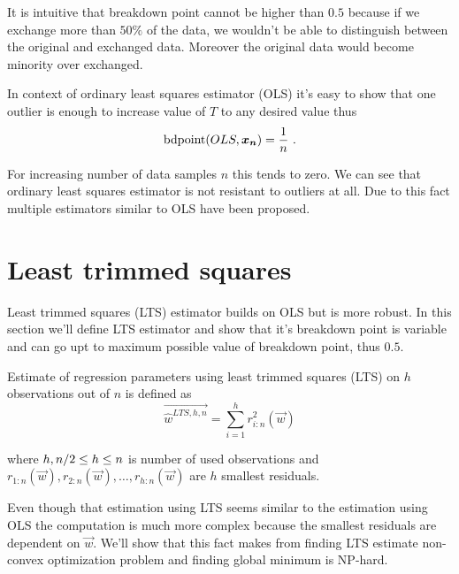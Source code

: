 It is intuitive that breakdown point cannot be higher than $0.5$ \cite{rouss:1986} because if we exchange more than $50\%$ of the data, we wouldn't be able to distinguish between the original and exchanged data. Moreover the original data would become minority over exchanged.


In context of ordinary least squares estimator (OLS) it's easy to show that one outlier is enough to increase value of $T$ to any desired value thus 
\begin{equation}
    \bdpoint(OLS,\vec{x_n} ) = \frac{1}{n}\ .
\end{equation}

For increasing number of data samples $n$ this tends to zero. We can see that ordinary least squares estimator is not resistant to outliers at all. Due to this fact multiple estimators similar to OLS have been proposed. 


\section{Least trimmed squares}
Least trimmed squares (LTS) estimator builds on OLS but is more robust. In this section we'll define LTS estimator and show that it's breakdown point is variable and can go upt to maximum possible value of breakdown point, thus $0.5$.


\begin{definition} Estimate of regression parameters using least trimmed squares (LTS) on $h$ observations out of $n$ is defined as
    \begin{equation}
        \vec{\hat{w}^{LTS, h, n}} =  \sum\limits_{i=1}^h r_{i:n}^2(\vec{w}) 
    \end{equation}

    where $h\\, n/2 \leq h \leq n$ is number of used observations and 
    $r_{1:n}(\vec{w}), r_{2:n}(\vec{w}),\ldots, r_{h:n}(\vec{w})$ are $h$ smallest residuals.
\end{definition}

Even though that estimation using LTS seems similar to the estimation using OLS the computation is much more complex because the smallest residuals are dependent on $\vec{w}$. We'll show that this fact makes from finding LTS estimate non-convex optimization problem and finding global minimum is NP-hard. 